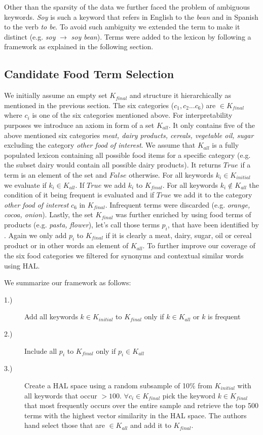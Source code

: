  Other than the sparsity of the data we further faced the problem of ambiguous keywords. \emph {Soy} is such a keyword that refers in English to the \emph{bean} and in Spanish to the verb \emph{to be}. To avoid such ambiguity we extended the term to make it distinct (e.g. \emph{soy} $\to$  \emph{soy bean}). Terms were added to the lexicon by following a framework as explained in the following section. 



\subsection{Candidate Food Term Selection}

We initially assume an empty set $K_{final}$ and structure it hierarchically as mentioned in the previous section. The six categories ($c_1, c_2 ... c_6)$ are $\in K_{final}$ where $c_i$ is one of the six categories mentioned above. For interpretability purposes we introduce an axiom in form of a set $K_{all}$. It only contains five of the above mentioned six categories \emph{meat, dairy products, cereals, vegetable oil, sugar} excluding the category \emph{other food of interest}. We assume that $K_{all}$ is a fully populated lexicon containing all possible food items for a specific category (e.g. the subset dairy would contain all possible dairy products). It returns $True$ if a term is an element of the set and $False$ otherwise. For all keywords $k_i \in K_{initial}$ we evaluate if $k_i\in K_{all}$. If $True$ we add $k_i$ to $K_{final}$. For all keywords $k_i \notin K_{all}$ the condition of it being frequent is evaluated and if $True$ we add it to the category \emph{other food of interest} $c_6 $ in $K_{final}$.  Infrequent terms were discarded (e.g. \emph {orange, cocoa, onion}). Lastly, the set $K_{final}$  was further enriched by using food terms of products (e.g. \emph{pasta, flower}), let's call those terms $p_i$, that have been identified by \cite{AbbarMW14}. Again we only add $p_i$ to $K_{final}$ if it is clearly a meat, dairy, sugar, oil or cereal product or in other words an element of $K_{all}$. To further improve our coverage of the six food categories we filtered for synonyms and contextual similar words using HAL. 

We summarize our framework as follows: 

\begin{description}
  \item[1.)] Add all keywords $k \in K_{initial}$ to  $K_{final}$ only if $k \in K_{all} $ or $k$ is frequent 
  \item[2.)] Include all $p_i$ to $K_{final}$ only if $p_i \in K_{all}$
  \item[3.)] Create a HAL space using a random subsample of 10\% from $K_{initial}$ with all keywords that occur $> 100$. $\forall c_i \in K_{final} $  pick the keyword $k\in K_{final}$ that most frequently occurs over the entire sample and retrieve the top 500 terms with the highest vector similarity in the HAL space. The authors hand select those that are $\in K_{all}$ and add it to $K_{final}$.
\end{description}

